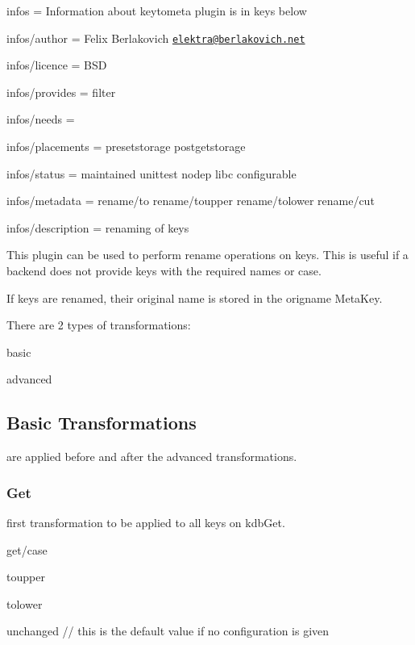 
\begin{DoxyItemize}
\item infos = Information about keytometa plugin is in keys below
\item infos/author = Felix Berlakovich \href{mailto:elektra@berlakovich.net}{\tt elektra@berlakovich.\+net}
\item infos/licence = B\+S\+D
\item infos/provides = filter
\item infos/needs =
\item infos/placements = presetstorage postgetstorage
\item infos/status = maintained unittest nodep libc configurable
\item infos/metadata = rename/to rename/toupper rename/tolower rename/cut
\item infos/description = renaming of keys
\end{DoxyItemize}

This plugin can be used to perform rename operations on keys. This is useful if a backend does not provide keys with the required names or case.

If keys are renamed, their original name is stored in the {\ttfamily origname} Meta\+Key.

There are 2 types of transformations\+:
\begin{DoxyItemize}
\item basic
\item advanced
\end{DoxyItemize}

\subsection*{Basic Transformations}

are applied before and after the advanced transformations.

\subsubsection*{Get}

first transformation to be applied to all keys on kdb\+Get.

{\ttfamily get/case}
\begin{DoxyItemize}
\item toupper
\item tolower
\item unchanged // this is the default value if no configuration is given
\end{DoxyItemize}

